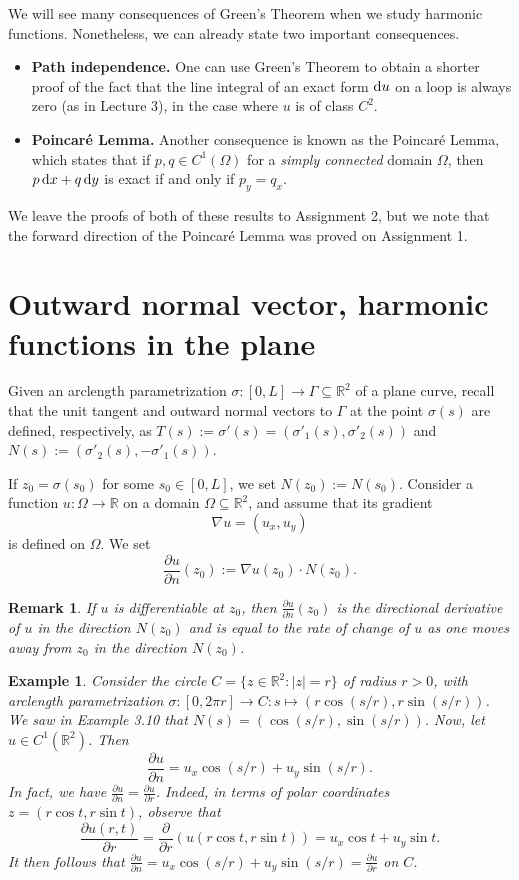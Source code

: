 \documentclass[10pt]{article}
\newcommand{\R}{\mathbb{R}}
\theoremstyle{newstyle}
\newtheorem{remark}[thm]{Remark}
\newtheorem{exmp}[thm]{Example}
\begin{document}
We will see many consequences of Green's Theorem when we study harmonic functions. Nonetheless, 
we can already state two important consequences.
\begin{itemize}
    \item {\bf Path independence.} One can use Green's Theorem to obtain a shorter proof of the 
    fact that the line integral of an exact form ${\rm d}u$ on a loop is always zero 
    (as in Lecture 3), in the case where $u$ is of class $C^2$.
    \item {\bf Poincar\'e Lemma.} Another consequence is known as the Poincar\'e Lemma, 
    which states that if $p, q \in C^1(\Omega)$ for a {\it simply connected} domain 
    $\Omega$, then $p\,{\rm d}x + q\,{\rm d}y$ is exact if and only if $p_y = q_x$.
\end{itemize}
We leave the proofs of both of these results to Assignment 2, but we note that the forward 
direction of the Poincar\'e Lemma was proved on Assignment 1.

\newpage
\section{Outward normal vector, harmonic functions in the plane}

Given an arclength parametrization $\sigma : [0, L] \to \Gamma \subseteq \R^2$ of a plane 
curve, recall that the unit tangent and outward normal vectors to $\Gamma$ at the point 
$\sigma(s)$ are defined, respectively, as 
$T(s) := \sigma'(s) = (\sigma'_1(s), \sigma'_2(s))$ and $N(s) := (\sigma'_2(s), -\sigma'_1(s))$. 

If $z_0 = \sigma(s_0)$ for some $s_0 \in [0, L]$, we set $N(z_0) := N(s_0)$. 
Consider a function $u : \Omega \to \R$ on a domain $\Omega \subseteq \R^2$, 
and assume that its gradient 
\[ \nabla u = (u_x, u_y) \]
is defined on $\Omega$. We set 
\[ \frac{\partial u}{\partial n}(z_0) := \nabla u(z_0) \cdot N(z_0). \]

\begin{remark}
If $u$ is differentiable at $z_0$, then $\frac{\partial u}{\partial n}(z_0)$ is the 
directional derivative of $u$ in the direction $N(z_0)$ and is equal to the rate of 
change of $u$ as one moves away from $z_0$ in the direction $N(z_0)$.
\end{remark}

\begin{exmp}
Consider the circle $C = \{z \in \R^2 : |z| = r\}$ of radius $r > 0$, with 
arclength parametrization $\sigma : [0, 2\pi r] \to C : s \mapsto (r\cos(s/r), r\sin(s/r))$. 
We saw in Example 3.10 that $N(s) = (\cos(s/r), \sin(s/r))$. 
Now, let $u \in C^1(\R^2)$. Then 
\[ \frac{\partial u}{\partial n} = u_x \cos(s/r) + u_y \sin(s/r). \]
In fact, we have $\frac{\partial u}{\partial n} = \frac{\partial u}{\partial r}$. Indeed, 
in terms of polar coordinates $z = (r\cos t, r\sin t)$, observe that 
\[ \frac{\partial u(r, t)}{\partial r} = \frac{\partial}{\partial r} (u(r\cos t, r\sin t)) 
= u_x \cos t + u_y \sin t. \] 
It then follows that $\frac{\partial u}{\partial n} = u_x \cos(s/r) + u_y \sin(s/r) 
= \frac{\partial u}{\partial r}$ on $C$.
\end{exmp}
\end{document}
